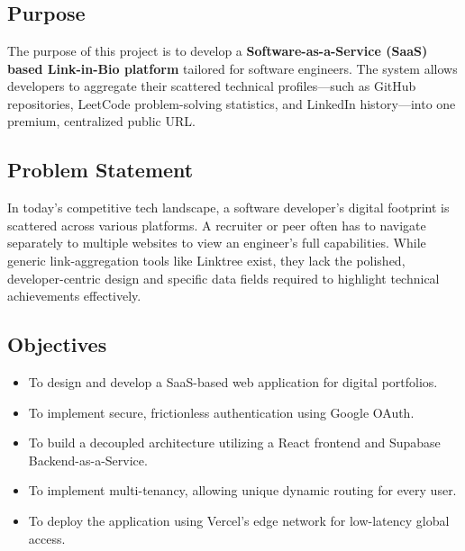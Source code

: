 \documentclass[12pt,a4paper]{report}     %
\begin{document}
\chapter{}
\begin{normalsize}

\section{Purpose}

The purpose of this project is to develop a \textbf{Software-as-a-Service (SaaS) based Link-in-Bio platform} tailored for software engineers. The system allows developers to aggregate their scattered technical profiles—such as GitHub repositories, LeetCode problem-solving statistics, and LinkedIn history—into one premium, centralized public URL. 

\section{Problem Statement}

In today's competitive tech landscape, a software developer's digital footprint is scattered across various platforms. A recruiter or peer often has to navigate separately to multiple websites to view an engineer's full capabilities. While generic link-aggregation tools like Linktree exist, they lack the polished, developer-centric design and specific data fields required to highlight technical achievements effectively.

\section{Objectives}

\begin{itemize}
    \item To design and develop a SaaS-based web application for digital portfolios.
    \item To implement secure, frictionless authentication using Google OAuth.
    \item To build a decoupled architecture utilizing a React frontend and Supabase Backend-as-a-Service.
    \item To implement multi-tenancy, allowing unique dynamic routing for every user.
    \item To deploy the application using Vercel's edge network for low-latency global access.
\end{itemize}


\end{normalsize}
\end{document}
